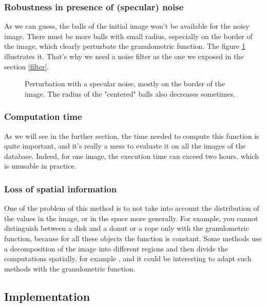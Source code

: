 \subsubsection{Robustness in presence of (specular) noise}

As we can guess, the balls of the initial image won't be available for the noisy image. There must be more balls with small radius, especially on the border of the image, which clearly perturbate the granulometric function. The figure \ref{device9-6-noised} illustrates it. That's why we need a noise filter as the one we exposed in the section \ref{filter}.

\begin{figure}[!ht]
    \centering
    \caption{Perturbation with a specular noise, mostly on the border of the image. The radius of the "centered" balls also decreases sometimes.}
	\label{device9-6-noised}
\end{figure}

\subsubsection{Computation time}

As we will see in the further section, the time needed to compute this function is quite important, and it's really a mess to evaluate it on all the images of the database. Indeed, for one image, the execution time can exceed two hours, which is unusable in practice.

\subsubsection{Loss of spatial information}

\label{loss-information}

One of the problem of this method is to not take into account the distribution of the values in the image, or in the space more generally. For example, you cannot distinguish between a disk and a donut or a rope only with the granulometric function, because for all these objects the function is constant. Some methods use a decomposition of the image into different regions and then divide the computations spatially, for example \cite{spacial-decompo}, and it could be interesting to adapt such methods with the granulometric function.

\subsection{Implementation}

